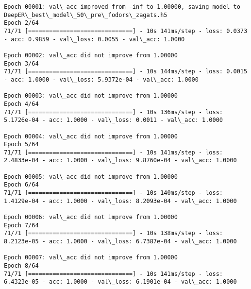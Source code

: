 \documentclass[11pt]{article}
\begin{document}
\begin{Verbatim}[commandchars=\\\{\}]
Epoch 00001: val\_acc improved from -inf to 1.00000, saving model to DeepER\_best\_model\_50\_pre\_fodors\_zagats.h5
Epoch 2/64
71/71 [==============================] - 10s 141ms/step - loss: 0.0373 - acc: 0.9859 - val\_loss: 0.0055 - val\_acc: 1.0000

Epoch 00002: val\_acc did not improve from 1.00000
Epoch 3/64
71/71 [==============================] - 10s 144ms/step - loss: 0.0015 - acc: 1.0000 - val\_loss: 5.9372e-04 - val\_acc: 1.0000

Epoch 00003: val\_acc did not improve from 1.00000
Epoch 4/64
71/71 [==============================] - 10s 136ms/step - loss: 5.1726e-04 - acc: 1.0000 - val\_loss: 0.0011 - val\_acc: 1.0000

Epoch 00004: val\_acc did not improve from 1.00000
Epoch 5/64
71/71 [==============================] - 10s 141ms/step - loss: 2.4833e-04 - acc: 1.0000 - val\_loss: 9.8760e-04 - val\_acc: 1.0000

Epoch 00005: val\_acc did not improve from 1.00000
Epoch 6/64
71/71 [==============================] - 10s 140ms/step - loss: 1.4129e-04 - acc: 1.0000 - val\_loss: 8.2093e-04 - val\_acc: 1.0000

Epoch 00006: val\_acc did not improve from 1.00000
Epoch 7/64
71/71 [==============================] - 10s 138ms/step - loss: 8.2123e-05 - acc: 1.0000 - val\_loss: 6.7387e-04 - val\_acc: 1.0000

Epoch 00007: val\_acc did not improve from 1.00000
Epoch 8/64
71/71 [==============================] - 10s 141ms/step - loss: 6.4323e-05 - acc: 1.0000 - val\_loss: 6.1901e-04 - val\_acc: 1.0000


\end{Verbatim}
\end{document}

